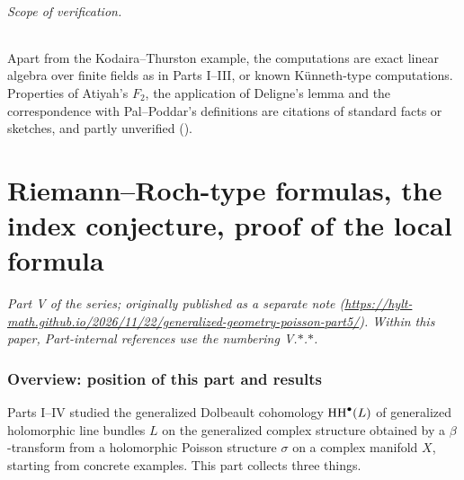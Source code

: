 \paragraph{Scope of verification.}Apart from the Kodaira--Thurston example, the computations are exact linear algebra over finite fields as in Parts I--III, or known Künneth-type computations. Properties of Atiyah's $F_2$, the application of Deligne's lemma and the correspondence with Pal--Poddar's definitions are citations of standard facts or sketches, and partly unverified (\tQ).



\clearpage
\part{Riemann--Roch-type formulas, the index conjecture, proof of the local formula}
\setcounter{section}{0}
\noindent\textit{Part V of the series; originally published as a separate note (\url{https://hylt-math.github.io/2026/11/22/generalized-geometry-poisson-part5/}). Within this paper, Part-internal references use the numbering V.$\ast$.$\ast$.}\par
\section{Overview: position of this part and results}
Parts I--IV studied the generalized Dolbeault cohomology $\mathrm{HH}^\bullet(L)$ of generalized holomorphic line bundles $L$ on the generalized complex structure obtained by a $\beta$-transform from a holomorphic Poisson structure $\sigma$ on a complex manifold $X$, starting from concrete examples. This part collects three things.

